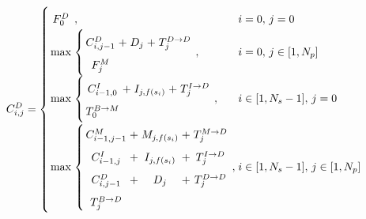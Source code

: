 \documentclass[a4paper,10pt,twoside]{scrartcl}
\begin{document}
\begin{equation} \label{std3} \arraycolsep=1.4pt\def\arraystretch{1.7}
  C_{i,j}^{D} = \left \{
		\begin{array}{c l l}
		  F^{D}_0 &,& i = 0,\, j = 0\\
		  
		  \max & \left \{
		  \begin{array} {ccccc}
		  C_{i,j-1}^{D}   &+& D_{j} &+& T^{D \rightarrow D}_j \\
		  F^{M}_j \\
		  \end{array} \right. , & i = 0,\, j \in [1,N_p]\\
		  
		  \max & \left \{
		  \begin{array} {ccccc}
		  C_{i-1,0}^{I}   &+& I_{j, f(s_i)} &+& T^{I \rightarrow D}_j \\
		  T^{B \rightarrow M}_0 \\
		  \end{array} \right. , & i \in [1,N_s-1],\, j = 0 \\
		
		  \max & \left \{
		  \begin{array} {ccccc}
		  C_{i-1,j-1}^{M} &+& M_{j, f(s_i)} &+& T^{M \rightarrow D}_j \\
		  C_{i-1,j}^{I}   &+& I_{j, f(s_i)} &+& T^{I \rightarrow D}_j \\
		  C_{i,j-1}^{D}   &+& D_{j} &+& T^{D \rightarrow D}_j \\
		  T^{B \rightarrow D}_j \\
		  \end{array} \right. , & i \in [1,N_s-1],\, j \in [1,N_p]\\
		\end{array}
		\right.
\end{equation}
\end{document}
